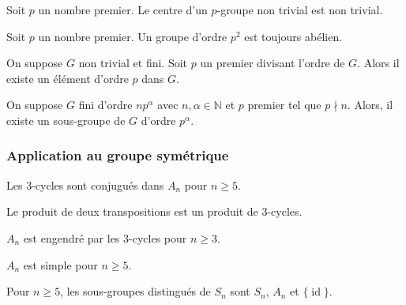   \begin{corollary}
    Soit $p$ un nombre premier. Le centre d'un $p$-groupe non trivial est non trivial.
  \end{corollary}

  \begin{corollary}
    Soit $p$ un nombre premier. Un groupe d'ordre $p^2$ est toujours abélien.
  \end{corollary}

  \begin{application}
    On suppose $G$ non trivial et fini. Soit $p$ un premier divisant l'ordre de $G$. Alors il existe un élément d'ordre $p$ dans $G$.
  \end{application}


  \begin{application}
    On suppose $G$ fini d'ordre $n p^\alpha$ avec $n, \alpha \in \mathbb{N}$ et $p$ premier tel que $p \nmid n$. Alors, il existe un sous-groupe de $G$ d’ordre $p^\alpha$.
  \end{application}

  \subsubsection{Application au groupe symétrique}


  \begin{lemma}
    Les $3$-cycles sont conjugués dans $A_n$ pour $n \geq 5$.
  \end{lemma}


  \begin{lemma}
    Le produit de deux transpositions est un produit de $3$-cycles.
  \end{lemma}

  \begin{proposition}
    $A_n$ est engendré par les $3$-cycles pour $n \geq 3$.
  \end{proposition}


  \begin{theorem}
    $A_n$ est simple pour $n \geq 5$.
  \end{theorem}

  \begin{corollary}
    Pour $n \geq 5$, les sous-groupes distingués de $S_n$ sont $S_n$, $A_n$ et $\{\operatorname{id}\}$.
  \end{corollary}

